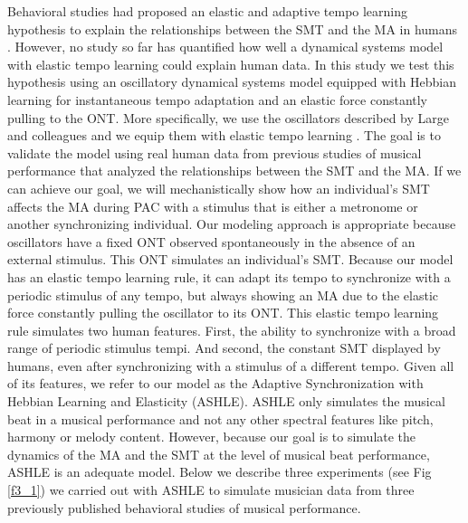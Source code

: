 \documentclass{report}
\begin{document}
Behavioral studies had proposed an elastic and adaptive tempo learning hypothesis to explain the relationships between the SMT and the MA in humans \cite{scheurich2018tapping}. However, no study so far has quantified how well a dynamical systems model with elastic tempo learning could explain human data. In this study we test this hypothesis using an oscillatory dynamical systems model equipped with Hebbian learning for instantaneous tempo adaptation and an elastic force constantly pulling to the ONT. More specifically, we use the oscillators described by Large and colleagues \cite{large2010canonical} and we equip them with elastic tempo learning \cite{righetti2009adaptive, lambert2016adaptive}. The goal is to validate the model using real human data from previous studies of musical performance that analyzed the relationships between the SMT and the MA. If we can achieve our goal, we will mechanistically show how an individual's SMT affects the MA during PAC with a stimulus that is either a metronome or another synchronizing individual. Our modeling approach is appropriate because oscillators have a fixed ONT observed spontaneously in the absence of an external stimulus. This ONT simulates an individual's SMT. Because our model has an elastic tempo learning rule, it can adapt its tempo to synchronize with a periodic stimulus of any tempo, but always showing an MA due to the elastic force constantly pulling the oscillator to its ONT. This elastic tempo learning rule simulates two human features. First, the ability to synchronize with a broad range of periodic stimulus tempi. And second, the constant SMT displayed by humans, even after synchronizing with a stimulus of a different tempo. Given all of its features, we refer to our model as the Adaptive Synchronization with Hebbian Learning and Elasticity (ASHLE). ASHLE only simulates the musical beat in a musical performance and not any other spectral features like pitch, harmony or melody content. However, because our goal is to simulate the dynamics of the MA and the SMT at the level of musical beat performance, ASHLE is an adequate model. Below we describe three experiments (see Fig \ref{f3_1}) we carried out with ASHLE to simulate musician data from three previously published behavioral studies of musical performance.
\end{document}
